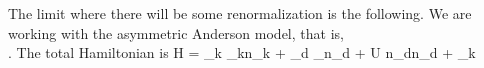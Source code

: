 \documentclass[14pt]{extarticle}
\numberwithin{equation}{section}
\begin{document}
{\begin{figure}[tbh!]
	\hspace*{30pt}
\end{figure}
The limit where there will be some renormalization is the following.
We are working with the asymmetric Anderson model, that is,\\ .
The total Hamiltonian is
\beq
H = \sum_{k\sigma} \epsilon_{k\sigma}n_{k\sigma} + \epsilon_d \sum_\sigma n_{d\sigma} + U n_{d\ua}n_{d\da} + \sum_{k\sigma}
}
\end{document}
